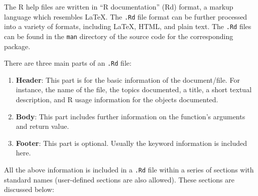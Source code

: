 \documentclass[
  letterpaper,
  DIV=11,
  numbers=noendperiod]{scrreprt}
\begin{document}
The R help files are written in ``R documentation'' (Rd) format, a
markup language which resembles LaTeX. The \texttt{.Rd} file format can
be further processed into a variety of formats, including LaTeX, HTML,
and plain text. The \texttt{.Rd} files can be found in the \texttt{man}
directory of the source code for the corresponding package.

There are three main parts of an \texttt{.Rd} file:

\begin{enumerate}
\def\labelenumi{\arabic{enumi}.}
\item
  \textbf{Header}: This part is for the basic information of the
  document/file. For instance, the name of the file, the topics
  documented, a title, a short textual description, and R usage
  information for the objects documented.
\item
  \textbf{Body}: This part includes further information on the
  function's arguments and return value.
\item
  \textbf{Footer}: This part is optional. Usually the keyword
  information is included here.
\end{enumerate}

All the above information is included in a \texttt{.Rd} file within a
series of sections with standard names (user-defined sections are also
allowed). These sections are discussed below:
\end{document}
